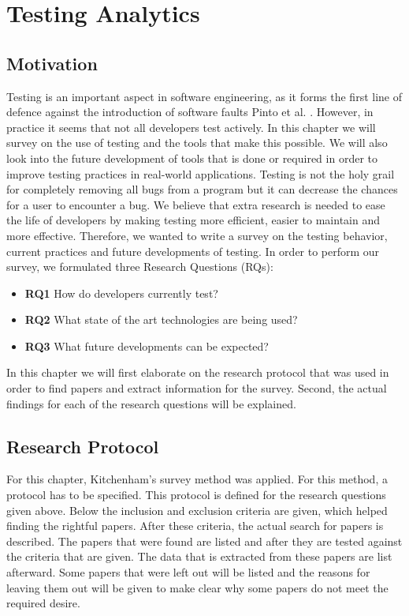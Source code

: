 \documentclass[]{book}
\providecommand{\tightlist}{%
  \setlength{\itemsep}{0pt}\setlength{\parskip}{0pt}}
\begin{document}
\chapter{Testing Analytics}\label{testing-analytics}

\section{Motivation}\label{motivation}

Testing is an important aspect in software engineering, as it forms the
first line of defence against the introduction of software faults Pinto
et al. \cite{pinto2012understanding}. However, in practice it seems that
not all developers test actively. In this chapter we will survey on the
use of testing and the tools that make this possible. We will also look
into the future development of tools that is done or required in order
to improve testing practices in real-world applications. Testing is not
the holy grail for completely removing all bugs from a program but it
can decrease the chances for a user to encounter a bug. We believe that
extra research is needed to ease the life of developers by making
testing more efficient, easier to maintain and more effective.
Therefore, we wanted to write a survey on the testing behavior, current
practices and future developments of testing. In order to perform our
survey, we formulated three Research Questions (RQs):

\begin{itemize}
\tightlist
\item
  \textbf{RQ1} How do developers currently test?
\item
  \textbf{RQ2} What state of the art technologies are being used?
\item
  \textbf{RQ3} What future developments can be expected?
\end{itemize}

In this chapter we will first elaborate on the research protocol that
was used in order to find papers and extract information for the survey.
Second, the actual findings for each of the research questions will be
explained.

\section{Research Protocol}\label{research-protocol}

For this chapter, Kitchenham's survey method \cite{Kitchenham2004} was
applied. For this method, a protocol has to be specified. This protocol
is defined for the research questions given above. Below the inclusion
and exclusion criteria are given, which helped finding the rightful
papers. After these criteria, the actual search for papers is described.
The papers that were found are listed and after they are tested against
the criteria that are given. The data that is extracted from these
papers are list afterward. Some papers that were left out will be listed
and the reasons for leaving them out will be given to make clear why
some papers do not meet the required desire.
\end{document}
